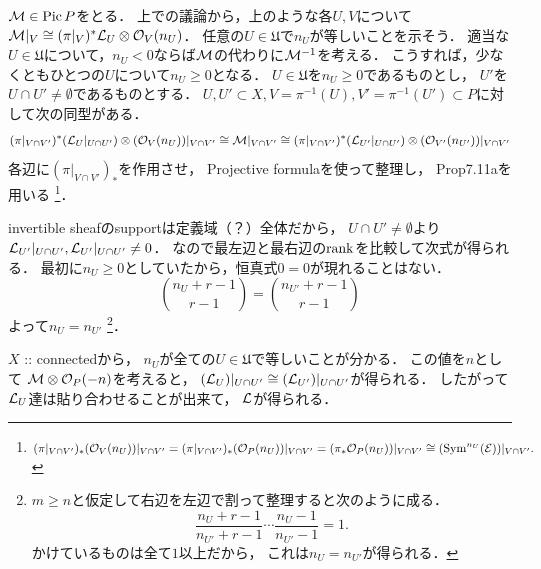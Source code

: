 \documentclass[a4paper]{jsarticle}
\newcommand{\coverU}{\mathfrak{U}}
\newcommand{\Pic}{\operatorname{Pic}}
\newcommand{\Sym}{\operatorname{Sym}}
\begin{document}
    $\shM \in \Pic P$をとる．
    上での議論から，上のような各$U, V$について
    $\mathcal{M}|_V \cong (\pi|_V)^* \mathcal{L}_U \otimes \mathcal{O}_V(n_U)$．
    任意の$U \in \coverU$で$n_U$が等しいことを示そう．
    適当な$U \in \coverU$について，$n_{U}<0$ならば$\mathcal{M}$の代わりに$\mathcal{M}^{-1}$を考える．
    こうすれば，少なくともひとつの$U$について$n_{U} \geq 0$となる．
    $U \in \coverU$を$n_U \geq 0$であるものとし，
    $U'$を$U \cap U' \neq \emptyset$であるものとする．
    $U,U' \subset X, V=\pi^{-1}(U),V'=\pi^{-1}(U') \subset P$に対して次の同型がある．
    \[
        (\pi|_{V \cap V'})^* (\mathcal{L}_{U}|_{U \cap U'}) \otimes (\mathcal{O}_{V}(n_U))|_{V \cap V'}
        \cong
        \mathcal{M}|_{V \cap V'}
        \cong
        (\pi|_{V \cap V'})^* (\mathcal{L}_{U'}|_{U \cap U'}) \otimes (\mathcal{O}_{V'}(n_{U'}))|_{V \cap V'}
    \]
    各辺に$(\pi|_{V \cap V'})_*$を作用させ，
    Projective formulaを使って整理し，
    Prop7.11aを用いる
    \footnote
    {
        $
        (\pi|_{V \cap V'})_*(\shO_{V}(n_U))|_{V \cap V'}
        =(\pi|_{V \cap V'})_*(\shO_P(n_U))|_{V \cap V'}
        =(\pi_*\shO_P(n_U))|_{V \cap V'}
        \iso (\Sym^{n_{U}}(\shE))|_{V \cap V'}.
        $
    }．
    
    invertible sheafのsupportは定義域（？）全体だから，
    $U \cap U' \neq \emptyset$より$\mathcal{L}_{U'}|_{U \cap U'}, \mathcal{L}_{U'}|_{U \cap U'} \neq 0$．
    なので最左辺と最右辺の$\operatorname{rank}$を比較して次式が得られる．
    最初に$n_U \geq 0$としていたから，恒真式$0=0$が現れることはない．
    \[ \binom{n_U+r-1}{r-1}=\binom{n_{U'}+r-1}{r-1} \]
    よって$n_U=n_{U'}$
    \footnote
    {
        $m \geq n$と仮定して右辺を左辺で割って整理すると次のように成る．
        \[ \frac{n_U+r-1}{n_{U'}+r-1} \cdots \frac{n_U-1}{n_{U'}-1}=1. \]
        かけているものは全て$1$以上だから，
        これは$n_U=n_{U'}$が得られる．
    }．

    $X$ :: connectedから，
    $n_U$が全ての$U \in \coverU$で等しいことが分かる．
    この値を$n$として
    $\mathcal{M} \otimes \mathcal{O}_P(-n)$を考えると，
    $(\mathcal{L}_U)|_{U \cap U'} \cong (\mathcal{L}_{U'})|_{U \cap U'}$が得られる．
    したがって$\mathcal{L}_U$達は貼り合わせることが出来て，
    $\mathcal{L}$が得られる．
\end{document}
